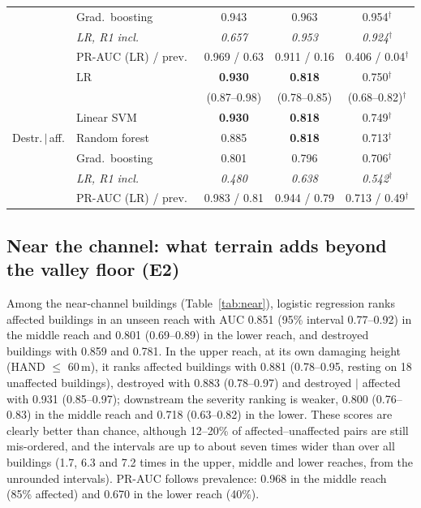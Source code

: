 \documentclass[journal,a4paper]{IEEEtran}
\begin{document}
\begin{table}[t]
\begin{tabular}{@{}llccc@{}}
 & Grad.\ boosting & 0.943 & 0.963 & 0.954$^\dagger$\\
 & \emph{LR, R1 incl.} & \emph{0.657} & \emph{0.953} & \emph{0.924}$^\dagger$\\
 & PR-AUC (LR) / prev.\ & 0.969 / 0.63 & 0.911 / 0.16 & 0.406 / 0.04$^\dagger$\\
\midrule
\multirow{7}{*}{Destr.\,$\mid$\,aff.} & LR & \textbf{0.930} & \textbf{0.818} & 0.750$^\dagger$\\
 & & {\scriptsize(0.87--0.98)} & {\scriptsize(0.78--0.85)} & {\scriptsize(0.68--0.82)}$^\dagger$\\
 & Linear SVM & \textbf{0.930} & \textbf{0.818} & 0.749$^\dagger$\\
 & Random forest & 0.885 & \textbf{0.818} & 0.713$^\dagger$\\
 & Grad.\ boosting & 0.801 & 0.796 & 0.706$^\dagger$\\
 & \emph{LR, R1 incl.} & \emph{0.480} & \emph{0.638} & \emph{0.542}$^\dagger$\\
 & PR-AUC (LR) / prev.\ & 0.983 / 0.81 & 0.944 / 0.79 & 0.713 / 0.49$^\dagger$\\
\bottomrule
\end{tabular}
\end{table}

\subsection{Near the channel: what terrain adds beyond the valley floor (E2)}\label{sec:near}
Among the near-channel buildings (Table~\ref{tab:near}), logistic regression ranks affected buildings in an unseen reach with AUC 0.851 (95\% interval 0.77--0.92) in the middle reach and 0.801 (0.69--0.89) in the lower reach, and destroyed buildings with 0.859 and 0.781. In the upper reach, at its own damaging height (HAND $\leq$ 60\,m), it ranks affected buildings with 0.881 (0.78--0.95, resting on 18 unaffected buildings), destroyed with 0.883 (0.78--0.97) and destroyed $\mid$ affected with 0.931 (0.85--0.97); downstream the severity ranking is weaker, 0.800 (0.76--0.83) in the middle reach and 0.718 (0.63--0.82) in the lower. These scores are clearly better than chance, although 12--20\% of affected--unaffected pairs are still mis-ordered, and the intervals are up to about seven times wider than over all buildings (1.7, 6.3 and 7.2 times in the upper, middle and lower reaches, from the unrounded intervals). PR-AUC follows prevalence: 0.968 in the middle reach (85\% affected) and 0.670 in the lower reach (40\%).
\end{document}

